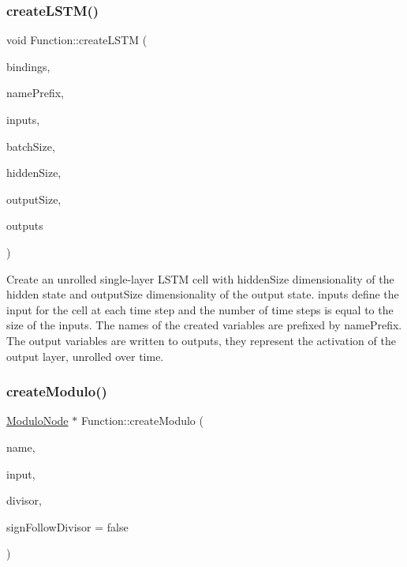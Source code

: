 \subsubsection{\texorpdfstring{create\+L\+S\+T\+M()}{createLSTM()}}
{\footnotesize\ttfamily void Function\+::create\+L\+S\+TM (\begin{DoxyParamCaption}\item[{\hyperlink{classglow_1_1_placeholder_bindings}{Placeholder\+Bindings} \&}]{bindings,  }\item[{llvm\+::\+String\+Ref}]{name\+Prefix,  }\item[{const llvm\+::\+Array\+Ref$<$ \hyperlink{structglow_1_1_node_value}{Node\+Value} $>$}]{inputs,  }\item[{unsigned}]{batch\+Size,  }\item[{unsigned}]{hidden\+Size,  }\item[{unsigned}]{output\+Size,  }\item[{std\+::vector$<$ \hyperlink{structglow_1_1_node_value}{Node\+Value} $>$ \&}]{outputs }\end{DoxyParamCaption})}

Create an unrolled single-\/layer L\+S\+TM cell with {\ttfamily hidden\+Size} dimensionality of the hidden state and {\ttfamily output\+Size} dimensionality of the output state. {\ttfamily inputs} define the input for the cell at each time step and the number of time steps is equal to the size of the {\ttfamily inputs}. The names of the created variables are prefixed by {\ttfamily name\+Prefix}. The output variables are written to {\ttfamily outputs}, they represent the activation of the output layer, unrolled over time. \mbox{\label{classglow_1_1_function_ae2629554747ce321d9ea9fc688ecde30}} 
\subsubsection{\texorpdfstring{create\+Modulo()}{createModulo()}}
{\footnotesize\ttfamily \hyperlink{classglow_1_1_modulo_node}{Modulo\+Node} $\ast$ Function\+::create\+Modulo (\begin{DoxyParamCaption}\item[{llvm\+::\+String\+Ref}]{name,  }\item[{\hyperlink{structglow_1_1_node_value}{Node\+Value}}]{input,  }\item[{int64\+\_\+t}]{divisor,  }\item[{bool}]{sign\+Follow\+Divisor = {\ttfamily false} }\end{DoxyParamCaption})}

